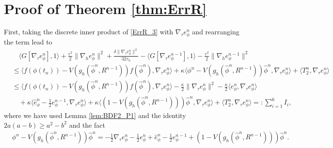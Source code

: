 \documentclass{m2an}
\begin{document}
\section{Proof of Theorem \ref{thm:ErrR}}\label{App:C}
\setcounter{equation}{0}
\renewcommand\theequation{B.\arabic{equation}}
First, taking the discrete inner product of \eqref{ErrR_3} with $ \nabla_{\tau} e_\phi^{n} $ and rearranging the term lead to
\begin{equation}\label{ErrR_5}
	\begin{aligned}
		& \quad \big\langle G[ \nabla_{\tau} e_\phi^{n} ], 1 \big\rangle + \frac{\varepsilon^2 }{2} \| \nabla_{h} e_\phi^{n} \|^2 + \frac{ \delta \| \nabla_{\tau} e_\phi^{n} \|^2 }{32 \tau_{n} } 
		- \big\langle G[ \nabla_{\tau} e_\phi^{n-1} ], 1 \big\rangle 
		- \frac{\varepsilon^2 }{2} \| \nabla_{h} e_\phi^{n-1} \|^2 
		\\
		& \leq \big\langle f( \phi( t_{n} ) ) - V( g_h(\hat{\phi}^{n}, R^{n-1}) )   f(\hat{\phi}^{n}), \nabla_{\tau} e_\phi^{n} \big\rangle  + \kappa \big\langle \phi^{n} - V ( g_h(\hat{\phi}^{n}, R^{n-1}) ) \hat{\phi}^{n}, \nabla_{\tau} e_\phi^{n} \big\rangle + \big\langle T_2^n, \nabla_{\tau} e_\phi^{n} \big\rangle\\
		& \leq \big\langle f( \phi( t_{n} ) ) - V( g_h(\hat{\phi}^{n}, R^{n-1}) )   f(\hat{\phi}^{n}), \nabla_{\tau} e_\phi^{n} \big\rangle 
		- \frac{\kappa }{2} \| \nabla_{\tau} e_\phi^{n} \|^2 - \frac{\kappa }{2} \big\langle e_{\phi}^{n}, \nabla_{\tau} e_\phi^{n} \big\rangle \\
		& \quad  + \kappa \big\langle \hat{e}_{\phi}^{n} - \frac{1}{2} e_{\phi}^{n-1}, \nabla_{\tau} e_\phi^{n} \big\rangle +  \kappa \big\langle ( 1 - V ( g_h(\hat{\phi}^{n}, R^{n-1}) ) ) \hat{\phi}^{n}, \nabla_{\tau} e_\phi^{n} \big\rangle  + \big\langle T_2^n, \nabla_{\tau} e_\phi^{n} \big\rangle   =: \sum^{6}_{i=1} I_{i},
	\end{aligned}
\end{equation}
where we have used Lemma \ref{lem:BDF2_P1} and the identity $ 2 a(a-b) \geq a^2 - b^2 $ and the fact
\begin{equation}\label{ErrR_phi_vphi}
	\begin{aligned}
		&\phi^{n} - V ( g_h(\hat{\phi}^{n}, R^{n-1}) ) \hat{\phi}^{n} = -\frac{1}{2}\nabla_{\tau} e_{\phi}^{n} - \frac{1}{2} e_{\phi}^{n} + \hat{e}_{\phi}^{n} - \frac{1}{2} e_{\phi}^{n-1} 
		+ ( 1 - V ( g_h(\hat{\phi}^{n}, R^{n-1}) ) ) \hat{\phi}^{n}.
	\end{aligned}
\end{equation}
\end{document}
